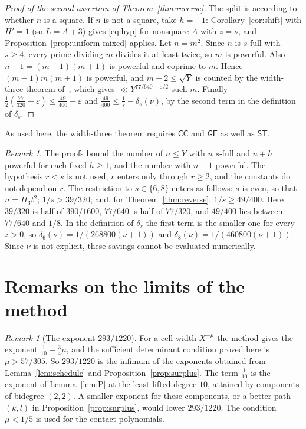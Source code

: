\documentclass[11pt,reqno]{amsart}
\theoremstyle{definition}
\theoremstyle{remark}
\newtheorem{remark}[theorem]{Remark}
\numberwithin{equation}{section}
\newcommand{\eps}{\varepsilon}\newcommand{\card}{\#}
\newcommand{\ST}{\mathsf{ST}}\newcommand{\CC}{\mathsf{CC}}\newcommand{\GE}{\mathsf{GE}}
\begin{document}
\begin{proof}[Proof of the second assertion of Theorem~\ref{thm:reverse}]
The split is according to whether $n$ is a square. If $n$ is not a square,
take $h=-1$: Corollary~\ref{cor:shift} with $H'=1$ (so $L=A+3$) gives
\eqref{eq:hyp} for nonsquare $A$ with $z=\nu$, and
Proposition~\ref{prop:uniform-mixed} applies. Let $n=m^2$. Since $n$ is
$s$-full with $s\ge4$, every prime dividing $m$ divides it at least twice,
so $m$ is powerful. Also $n-1=(m-1)(m+1)$ is powerful and coprime to $m$.
Hence $(m-1)m(m+1)$ is powerful, and $m-2\le\sqrt Y$ is counted by the
width-three theorem of~\cite[Theorem~1.2]{powerful}, which gives
$\ll Y^{77/640+\eps/2}$ such $m$. Finally
$\frac12(\frac{77}{320}+\eps)\le\frac{49}{400}+\eps$ and
$\frac{49}{400}\le\frac1s-\delta_s(\nu)$, by the second term in the
definition of $\delta_s$.
\end{proof}
As used here, the width-three theorem requires $\CC$ and $\GE$ as well as
$\ST$.

\begin{remark}\label{rem:rs}
The proofs bound the number of $n\le Y$ with $n$ $s$-full and $n+h$
powerful for each fixed $h\ge1$, and the number with $n-1$ powerful.
The hypothesis $r<s$ is not used, $r$ enters only through
$r\ge2$, and the constants do not depend on $r$. The restriction to
$s\in\{6,8\}$ enters as follows: $s$ is even, so that $n=H_3t^2$;
$1/s>39/320$; and, for Theorem~\ref{thm:reverse}, $1/s\ge49/400$. Here $39/320$ is half of $390/1600$, $77/640$ is half of $77/320$, and
$49/400$ lies between $77/640$ and $1/8$. In the definition of $\delta_s$ the first term is the
smaller one for every $z>0$, so $\delta_6(\nu)=1/(268800(\nu+1))$ and
$\delta_8(\nu)=1/(460800(\nu+1))$. Since $\nu$ is not explicit, these savings
cannot be evaluated numerically.
\end{remark}

\section{Remarks on the limits of the method}\label{sec:remarks}
\begin{remark}[The exponent $293/1220$]\label{rem:exponent}
For a cell width $X^{-\mu}$ the method gives the exponent
$\frac1{10}+\frac34\mu$, and the sufficient determinant condition proved here is
$\mu>57/305$. So
$293/1220$ is the infimum of the exponents obtained from
Lemma~\ref{lem:schedule} and Proposition~\ref{prop:surplus}. The term
$\frac1{10}$ is the exponent of Lemma~\ref{lem:P} at the least lifted
degree $10$, attained by components of bidegree $(2,2)$. A smaller exponent
for these components, or a better path $(k,l)$ in
Proposition~\ref{prop:surplus}, would lower $293/1220$. The condition
$\mu<1/5$ is used for the contact polynomials.
\end{remark}
\end{document}
